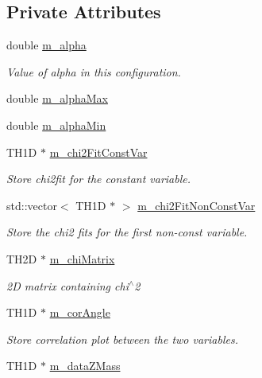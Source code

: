 \subsection*{Private Attributes}
\begin{DoxyCompactItemize}
\item 
double \hyperlink{classTemplateMethod_1_1ChiMatrix_abc4e2a8e4e5c6923f00d9d20a7786312}{m\+\_\+alpha}
\begin{DoxyCompactList}\small\item\em Value of alpha in this configuration. \end{DoxyCompactList}\item 
double \hyperlink{classTemplateMethod_1_1ChiMatrix_a3c58db9629e3125d82a362d089b1aa19}{m\+\_\+alpha\+Max}
\item 
double \hyperlink{classTemplateMethod_1_1ChiMatrix_ace2a02d8d9d9b62f6cac1a141fc54dfc}{m\+\_\+alpha\+Min}
\item 
T\+H1\+D $\ast$ \hyperlink{classTemplateMethod_1_1ChiMatrix_a0c339bef8976af15b2126b06c496be4e}{m\+\_\+chi2\+Fit\+Const\+Var}
\begin{DoxyCompactList}\small\item\em Store chi2fit for the constant variable. \end{DoxyCompactList}\item 
std\+::vector$<$ T\+H1\+D $\ast$ $>$ \hyperlink{classTemplateMethod_1_1ChiMatrix_a44cd2bf4ae7ce948665eb478f1d12d44}{m\+\_\+chi2\+Fit\+Non\+Const\+Var}
\begin{DoxyCompactList}\small\item\em Store the chi2 fits for the first non-\/const variable. \end{DoxyCompactList}\item 
T\+H2\+D $\ast$ \hyperlink{classTemplateMethod_1_1ChiMatrix_a4dba95d34eb2a8ae94f29c3ba02f0f08}{m\+\_\+chi\+Matrix}
\begin{DoxyCompactList}\small\item\em 2\+D matrix containing chi$^\wedge$2 \end{DoxyCompactList}\item 
T\+H1\+D $\ast$ \hyperlink{classTemplateMethod_1_1ChiMatrix_a6d3b71ff9e032583c59848dacf006bb8}{m\+\_\+cor\+Angle}
\begin{DoxyCompactList}\small\item\em Store correlation plot between the two variables. \end{DoxyCompactList}\item 
T\+H1\+D $\ast$ \hyperlink{classTemplateMethod_1_1ChiMatrix_a885a4dd9cbc483fdb50669786b22b2b6}{m\+\_\+data\+Z\+Mass}

\end{DoxyCompactItemize}
